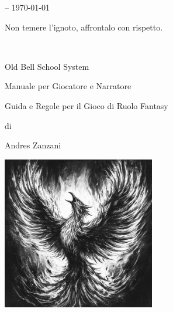 \vfill


\begin{center}\textbf{\versione} -- \today\end{center}

\vspace{1cm}


\begin{changemargin}{0.3cm}{0.3cm}\begin{tcolorbox}
\begin{center}
Non temere l'ignoto, affrontalo con rispetto.
\end{center}
\end{tcolorbox}\end{changemargin}


\thispagestyle{empty}


\newpage~\thispagestyle{empty}%


\pagebreak

{\Huge \begin{center} Old Bell School System \end{center}}

\bigskip

\begin{center}{\LARGE Manuale per Giocatore e Narratore}\\ \end{center}

{\large \begin{center} Guida e Regole per il Gioco di Ruolo Fantasy \end{center}}

\begin{center}di \end{center}

{\LARGE \begin{center} Andres Zanzani \end{center}}

\vspace{2cm}

\begin{center}
\includegraphics[keepaspectratio,width=0.50\textwidth]{immagini/phoenix-ai.png}
\end{center}

